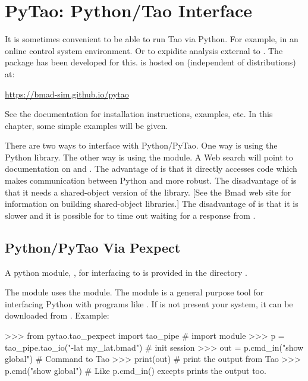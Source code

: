 \chapter{PyTao: Python/Tao Interface}
\label{c:python}

It is sometimes convenient to be able to run Tao via Python. For example, in an online control
system environment. Or to expidite analysis external to \tao. The  package has been
developed for this.  is hosted on  (independent of \bmad distributions) at:
\begin{example}
  \url{https://bmad-sim.github.io/pytao}
\end{example}
See the  documentation for installation instructions, examples, etc. In this chapter, some
simple examples will be given.

There are two ways to interface with Python/PyTao. One way is using the Python 
library. The other way is using the  module. A Web search will point to documentation on
 and . The advantage of  is that it directly accesses \tao code
which makes communication between Python and \tao more robust. The disadvantage of  is
that it needs a shared-object version of the  library. [See the Bmad web site for
information on building shared-object libraries.] The disadvantage of  is that it is
slower and it is possible for  to time out waiting for a response from \tao.

\section{Python/PyTao Via Pexpect}

A python module, , for interfacing \tao to  is provided in the directory
.

The  module uses the  module. The  module is a general purpose
tool for interfacing Python with programs like \tao. If  is not present your system, it
can be downloaded from . Example:
\begin{example}
  >>> from pytao.tao_pexpect import tao_pipe  # import module
  >>> p = tao_pipe.tao_io("-lat my_lat.bmad") # init session
  >>> out = p.cmd_in("show global")           # Command to Tao
  >>> print(out)                              # print the output from Tao
  >>> p.cmd("show global")                    # Like p.cmd_in() excepts prints the output too.
\end{example}

